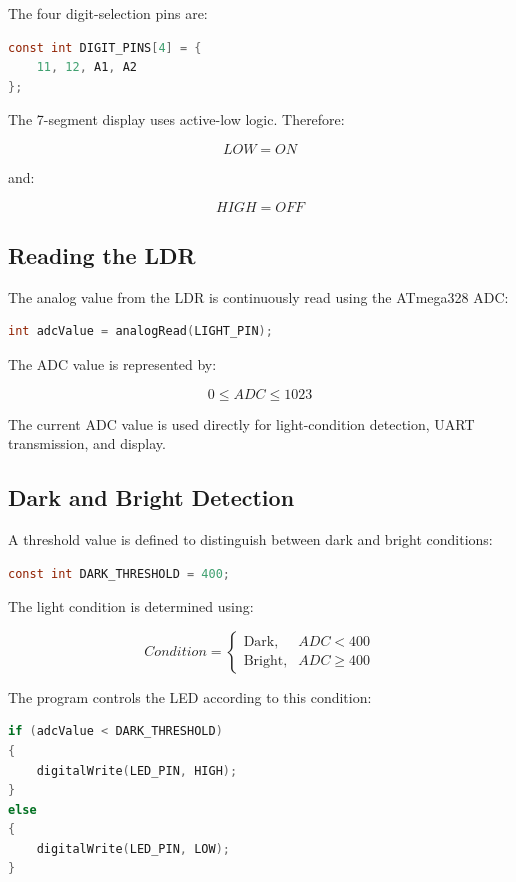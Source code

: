 \documentclass[12pt,a4paper]{article}
\begin{document}
The four digit-selection pins are:

\begin{lstlisting}[language=C]
const int DIGIT_PINS[4] = {
    11, 12, A1, A2
};
\end{lstlisting}

The 7-segment display uses active-low logic. Therefore:

\[
LOW = ON
\]

and:

\[
HIGH = OFF
\]

\subsection{Reading the LDR}

The analog value from the LDR is continuously read using the
ATmega328 ADC:

\begin{lstlisting}[language=C]
int adcValue = analogRead(LIGHT_PIN);
\end{lstlisting}

The ADC value is represented by:

\[
0 \leq ADC \leq 1023
\]

The current ADC value is used directly for light-condition detection,
UART transmission, and display.

\subsection{Dark and Bright Detection}

A threshold value is defined to distinguish between dark and bright
conditions:

\begin{lstlisting}[language=C]
const int DARK_THRESHOLD = 400;
\end{lstlisting}

The light condition is determined using:

\[
Condition =
\begin{cases}
\text{Dark}, & ADC < 400\\
\text{Bright}, & ADC \geq 400
\end{cases}
\]

The program controls the LED according to this condition:

\begin{lstlisting}[language=C]
if (adcValue < DARK_THRESHOLD)
{
    digitalWrite(LED_PIN, HIGH);
}
else
{
    digitalWrite(LED_PIN, LOW);
}
\end{lstlisting}
\end{document}

